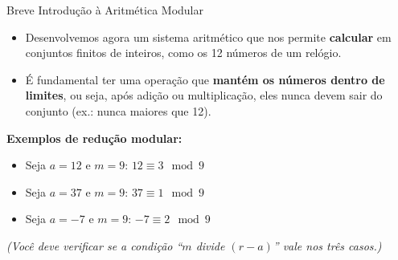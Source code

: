 \documentclass{beamer}
\begin{document}
\begin{frame}{Breve Introdução à Aritmética Modular}
\begin{itemize}
    \item Desenvolvemos agora um sistema aritmético que nos permite \textbf{calcular} em conjuntos finitos de inteiros, como os 12 números de um relógio.
    
    \item É fundamental ter uma operação que \textbf{mantém os números dentro de limites}, ou seja, após adição ou multiplicação, eles nunca devem sair do conjunto (ex.: nunca maiores que 12).
\end{itemize}

\begin{center}
\end{center}

\vspace{0.5em}
\textbf{Exemplos de redução modular:}
\begin{itemize}
    \item Seja $a = 12$ e $m = 9$: \quad $12 \equiv 3 \mod 9$
    \item Seja $a = 37$ e $m = 9$: \quad $37 \equiv 1 \mod 9$
    \item Seja $a = -7$ e $m = 9$: \quad $-7 \equiv 2 \mod 9$
\end{itemize}

\smallskip
\textit{(Você deve verificar se a condição “$m$ divide $(r - a)$” vale nos três casos.)}
\end{frame}
\end{document}

